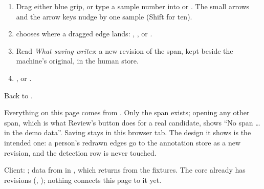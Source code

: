 \begin{enumerate}
  \item Drag either blue grip, or type a sample number into  or . The
    small arrows and the arrow keys nudge by one sample (Shift for ten).
  \item {} chooses where a dragged edge lands: ,
    ,  or .
  \item Read \emph{What saving writes}: a new revision of the span, kept beside the
    machine's original, in the human store.
  \item {}, or .
\end{enumerate}

Back to .

\begin{watchout}
Everything on this page comes from . Only the
span  exists; opening any other span, which is what Review's button does for a
real candidate, shows ``No span \ldots{} in the demo data''. Saving stays in this browser
tab. The design it shows is the intended one: a person's redrawn edges go to the annotation
store as a new revision, and the detection row is never touched.
\end{watchout}

\begin{underthehood}
Client: ; data from  in
, which returns  from the fixtures.
The core already has revisions (, );
nothing connects this page to it yet.
\end{underthehood}
